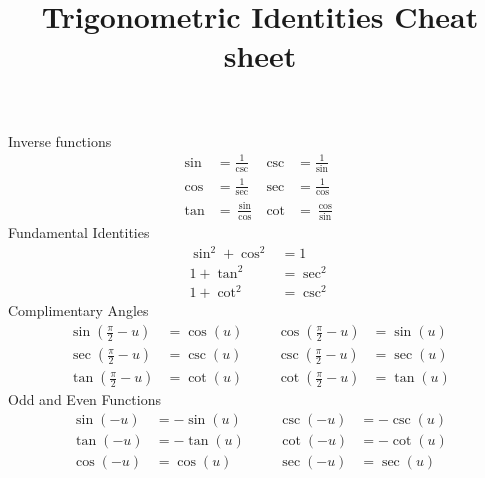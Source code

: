 \documentclass{article}
\title{\vspace{-5ex}Trigonometric Identities Cheat sheet  \vspace{-5ex}}
\author{}
\date{}
\newcommand{\nine}{\frac{\pi}{2}}
\begin{document}
	\maketitle{}
	
	Inverse functions
	\begin{align*}
		\sin &= \frac{1}{\csc}  & \csc & = \frac{1}{\sin} \\
		\cos &= \frac{1}{\sec} & \sec & = \frac{1}{\cos} \\
		\tan &= \frac{\sin}{\cos}  & \cot & = \frac{\cos}{\sin}
	\end{align*}
	Fundamental Identities
	\begin{align*}
		\sin^2 + \cos^2 &= 1 \\
		1 + \tan^2 &= \sec^2 \\
		1 + \cot^2 &= \csc^2
	\end{align*}
	Complimentary Angles
	\begin{align*}
		\sin(\nine - u) &= \cos(u)  & & & \cos(\nine - u) &= \sin(u) \\
		\sec(\nine - u) &= \csc(u) & & & \csc(\nine - u) &= \sec(u) \\
		\tan(\nine - u) &= \cot(u) & & & \cot(\nine - u) &= \tan(u)
	\end{align*}
	Odd and Even Functions
	\begin{align*}
		\sin(-u) &= -\sin(u)  & & & \csc(-u) &= -\csc(u) \\
		\tan(-u) &= -\tan(u) & & & \cot(-u) &= -\cot(u) \\
		\cos(-u) &= \cos(u) & & & \sec(-u) &= \sec(u)
	\end{align*}
\end{document}
